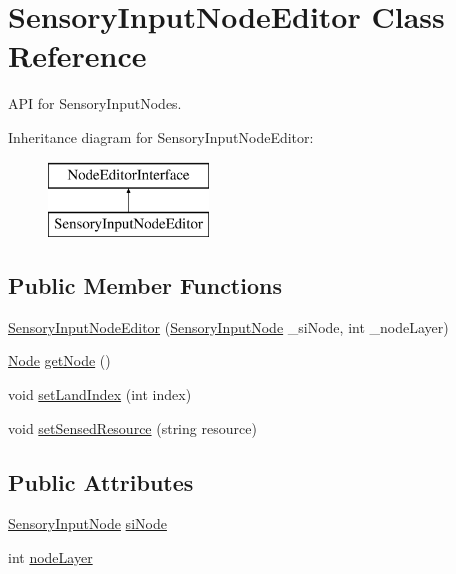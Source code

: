 \hypertarget{class_sensory_input_node_editor}{}\section{Sensory\+Input\+Node\+Editor Class Reference}
\label{class_sensory_input_node_editor}


A\+PI for Sensory\+Input\+Nodes.  


Inheritance diagram for Sensory\+Input\+Node\+Editor\+:\begin{figure}[H]
\begin{center}
\leavevmode
\includegraphics[height=2.000000cm]{class_sensory_input_node_editor}
\end{center}
\end{figure}
\subsection*{Public Member Functions}
\begin{DoxyCompactItemize}
\item 
\mbox{\hyperlink{class_sensory_input_node_editor_aa2b8400dc6ba926026c2580ed83fdc25}{Sensory\+Input\+Node\+Editor}} (\mbox{\hyperlink{class_sensory_input_node}{Sensory\+Input\+Node}} \+\_\+si\+Node, int \+\_\+node\+Layer)
\item 
\mbox{\hyperlink{class_node}{Node}} \mbox{\hyperlink{class_sensory_input_node_editor_ab6f6a94004254d8bba213a6e91fcc946}{get\+Node}} ()
\item 
void \mbox{\hyperlink{class_sensory_input_node_editor_a6c8e83c4bf895984f57f712f1fad1dcb}{set\+Land\+Index}} (int index)
\item 
void \mbox{\hyperlink{class_sensory_input_node_editor_a6441e77cda6614c60aeac8585acd2b4e}{set\+Sensed\+Resource}} (string resource)
\end{DoxyCompactItemize}
\subsection*{Public Attributes}
\begin{DoxyCompactItemize}
\item 
\mbox{\hyperlink{class_sensory_input_node}{Sensory\+Input\+Node}} \mbox{\hyperlink{class_sensory_input_node_editor_a276780a449128bccbae7730ef816f6db}{si\+Node}}
\item 
int \mbox{\hyperlink{class_sensory_input_node_editor_a22f4c25856b251e847ad8ac4d90351bf}{node\+Layer}}
\end{DoxyCompactItemize}


